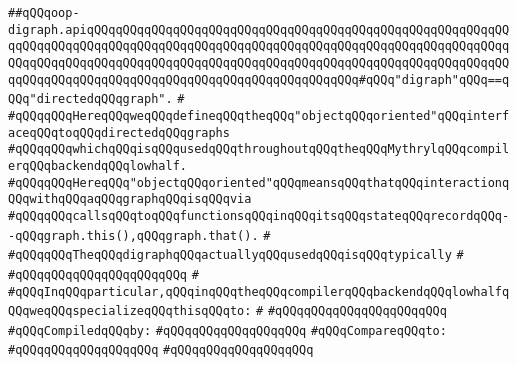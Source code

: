 \label{src/lib/graph/oop-digraph.api}
\verb|##qQQqoop-digraph.apiqQQqqQQqqQQqqQQqqQQqqQQqqQQqqQQqqQQqqQQqqQQqqQQqqQQqqQQqqQQqqQQqqQQqqQQqqQQqqQQqqQQqqQQqqQQqqQQqqQQqqQQqqQQqqQQqqQQqqQQqqQQqqQQqqQQqqQQqqQQqqQQqqQQqqQQqqQQqqQQqqQQqqQQqqQQqqQQqqQQqqQQqqQQqqQQqqQQqqQQqqQQqqQQqqQQqqQQqqQQqqQQqqQQqqQQqqQQqqQQqqQQqqQQq#qQQq"digraph"qQQq==qQQq"directedqQQqgraph".|\newline
\verb|#|\newline
\verb|#qQQqqQQqHereqQQqweqQQqdefineqQQqtheqQQq"objectqQQqoriented"qQQqinterfaceqQQqtoqQQqdirectedqQQqgraphs|\newline
\verb|#qQQqqQQqwhichqQQqisqQQqusedqQQqthroughoutqQQqtheqQQqMythrylqQQqcompilerqQQqbackendqQQqlowhalf.|\newline
\verb|#qQQqqQQqHereqQQq"objectqQQqoriented"qQQqmeansqQQqthatqQQqinteractionqQQqwithqQQqaqQQqgraphqQQqisqQQqvia|\newline
\verb|#qQQqqQQqcallsqQQqtoqQQqfunctionsqQQqinqQQqitsqQQqstateqQQqrecordqQQq--qQQqgraph.this(),qQQqgraph.that().|\newline
\verb|#|\newline
\verb|#qQQqqQQqTheqQQqdigraphqQQqactuallyqQQqusedqQQqisqQQqtypically|\newline
\verb|#|\newline
\verb|#qQQqqQQqqQQqqQQqqQQqqQQq|\newline
\verb|#|\newline
\verb|#qQQqInqQQqparticular,qQQqinqQQqtheqQQqcompilerqQQqbackendqQQqlowhalfqQQqweqQQqspecializeqQQqthisqQQqto:|\newline
\verb|#|\newline
\verb|#qQQqqQQqqQQqqQQqqQQqqQQq|\newline
\newline
\verb|#qQQqCompiledqQQqby:|\newline
\verb|#qQQqqQQqqQQqqQQqqQQq|\newline
\newline
\verb|#qQQqCompareqQQqto:|\newline
\verb|#qQQqqQQqqQQqqQQqqQQq|\newline
\verb|#qQQqqQQqqQQqqQQqqQQq|\newline
